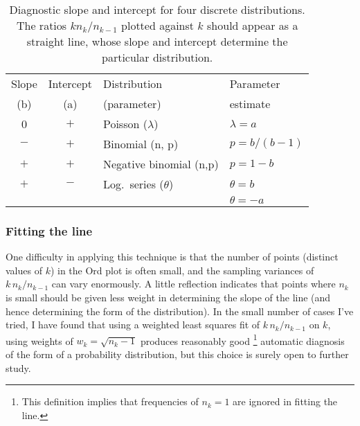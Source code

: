 \begin{table}[htb]
\caption[Diagnostic slope and intercept for four discrete distributions]{Diagnostic slope and
intercept for four discrete distributions.  The ratios $k n_k / n_{k-1}$ plotted
against $k$ should appear as a straight line, whose slope and intercept
determine the particular distribution.}
\label{tab:ordparm}
\begin{center}
\begin{tabular}{|ccll|}\hline
Slope & Intercept & Distribution & Parameter \\
(b)   & (a)       & (parameter)  &  estimate \\ \hline
0     &  $+$      &  Poisson (\(\lambda\)) & \(\lambda = a\)    \\
$-$   &  $+$      &  Binomial (n, p)       & \(p = b / (b-1)\)  \\
$+$   &  $+$      &  Negative binomial (n,p)      & \(p = 1 - b\)      \\
$+$   &  $-$      &  Log.\ series (\(\theta\)) & \(\theta =  b\) \\
      &      &                     &   \(\theta = - a\) \\ \hline
\end{tabular}
\end{center}
\end{table}

\subsubsection{Fitting the line}
One difficulty in applying this technique is that the number of points
(distinct values of $k$)
in the Ord plot is often small, and the sampling variances of
\(k \,  n_k /  n_{k-1}\) can vary enormously.
A little reflection indicates that points where $n_k$ is small
should be given less weight in determining the slope of the
line (and hence determining the form of the distribution).
In the small number of cases I've
tried, I have found that using a weighted least squares fit of \(k \,
n_k /  n_{k-1}\) on \(k\), using weights of \(w_k = \sqrt { n_k -1
}\)
produces reasonably good%
\footnote{This definition implies that frequencies of $n_k =1$
are ignored in fitting the line.}
automatic diagnosis of the form of a
probability distribution, but this choice is surely open to further study.

